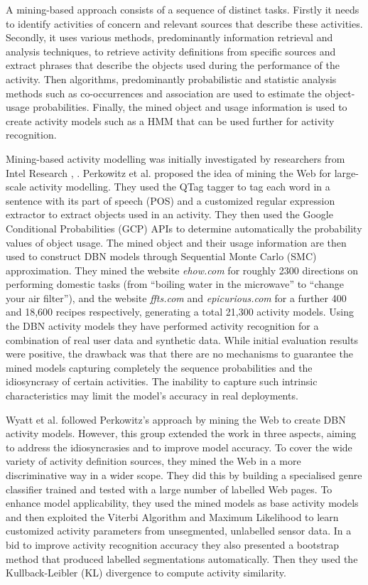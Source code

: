 A mining-based approach consists of a sequence of distinct tasks. Firstly it needs to identify activities of concern and relevant sources that describe these activities. Secondly, it uses various methods, predominantly information retrieval and analysis techniques, to retrieve activity definitions from specific sources and extract phrases that describe the objects used during the performance of the activity. Then algorithms, predominantly probabilistic and statistic analysis methods such as co-occurrences and association are used to estimate the object-usage probabilities. Finally, the mined object and usage information is used to create activity models such as a HMM that can be used further for activity recognition. 

Mining-based activity modelling was initially investigated by researchers from Intel Research \cite{Wu2007}, \cite{Wyatt2005}. Perkowitz et al. \cite{Perkowitz2004} proposed the idea of mining the Web for large-scale activity modelling. They used the QTag tagger to tag each word in a sentence with its part of speech (POS) and a customized regular expression extractor to extract objects used in an activity. They then used the Google Conditional Probabilities (GCP) APIs to determine automatically the probability values of object usage. The mined object and their usage information are then used to construct DBN models through Sequential Monte Carlo (SMC) approximation. They mined the website \textit{ehow.com} for roughly 2300 directions on performing domestic tasks (from “boiling water in the microwave” to “change your air filter”), and the website \textit{ffts.com} and \textit{epicurious.com} for a further 400 and 18,600 recipes respectively, generating a total 21,300 activity models. Using the DBN activity models they have performed activity recognition for a combination of real user data and synthetic data. While initial evaluation results were positive, the drawback was that there are no mechanisms to guarantee the mined models capturing completely the sequence probabilities and the idiosyncrasy of certain activities. The inability to capture such intrinsic characteristics may limit the model's accuracy in real deployments.

Wyatt et al. \cite{Wyatt2005} followed Perkowitz’s approach by mining the Web to create DBN activity models. However, this group extended the work in three aspects, aiming to address the idiosyncrasies and to improve model accuracy. To cover the wide variety of activity definition sources, they mined the Web in a more discriminative way in a wider scope. They did this by building a specialised genre classifier trained and tested with a large number of labelled Web pages. To enhance model applicability, they used the mined models as base activity models and then exploited the Viterbi Algorithm and Maximum Likelihood to learn customized activity parameters from unsegmented, unlabelled sensor data. In a bid to improve activity recognition accuracy they also presented a bootstrap method that produced labelled segmentations automatically. Then they used the Kullback-Leibler (KL) divergence to compute activity similarity.

